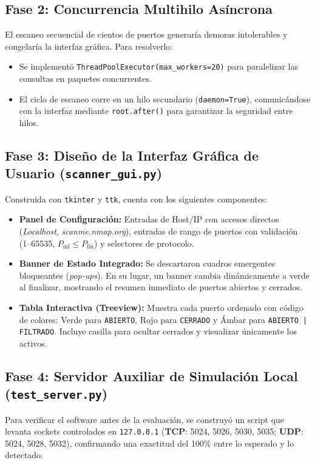 \documentclass[10pt,a4paper]{article}
\newcommand{\TCP}{\textbf{TCP}}
\newcommand{\UDP}{\textbf{UDP}}
\begin{document}
\subsection{Fase 2: Concurrencia Multihilo Asíncrona}
El escaneo secuencial de cientos de puertos generaría demoras intolerables y congelaría la interfaz gráfica. Para resolverlo:
\begin{itemize}[leftmargin=*,itemsep=1pt]
    \item Se implementó \texttt{ThreadPoolExecutor(max\_workers=20)} para paralelizar las consultas en paquetes concurrentes.
    \item El ciclo de escaneo corre en un hilo secundario (\texttt{daemon=True}), comunicándose con la interfaz mediante \texttt{root.after()} para garantizar la seguridad entre hilos.
\end{itemize}

\subsection{Fase 3: Diseño de la Interfaz Gráfica de Usuario (\texttt{scanner\_gui.py})}
Construida con \texttt{tkinter} y \texttt{ttk}, cuenta con los siguientes componentes:
\begin{itemize}[leftmargin=*,itemsep=1pt]
    \item \textbf{Panel de Configuración:} Entradas de Host/IP con accesos directos (\textit{Localhost}, \textit{scanme.nmap.org}), entradas de rango de puertos con validación (1--65535, $P_{\text{ini}} \le P_{\text{fin}}$) y selectores de protocolo.
    \item \textbf{Banner de Estado Integrado:} Se descartaron cuadros emergentes bloqueantes (\textit{pop-ups}). En su lugar, un banner cambia dinámicamente a verde al finalizar, mostrando el resumen inmediato de puertos abiertos y cerrados.
    \item \textbf{Tabla Interactiva (Treeview):} Muestra cada puerto ordenado con código de colores: Verde para \texttt{ABIERTO}, Rojo para \texttt{CERRADO} y Ámbar para \texttt{ABIERTO | FILTRADO}. Incluye casilla para ocultar cerrados y visualizar únicamente los activos.
\end{itemize}

\subsection{Fase 4: Servidor Auxiliar de Simulación Local (\texttt{test\_server.py})}
Para verificar el software antes de la evaluación, se construyó un script que levanta sockets controlados en \texttt{127.0.0.1} (\TCP{}: 5024, 5026, 5030, 5035; \UDP{}: 5024, 5028, 5032), confirmando una exactitud del 100\% entre lo esperado y lo detectado.
\end{document}
